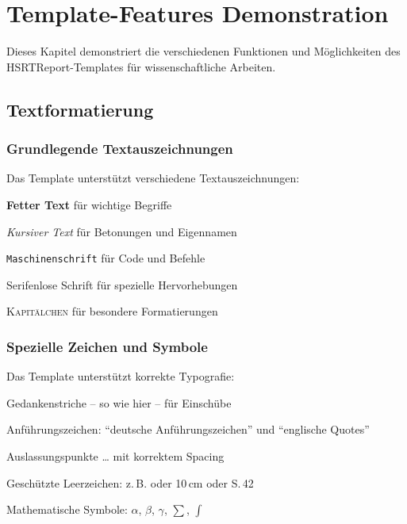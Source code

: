 
\chapter{Template-Features Demonstration}
\label{chap:template_demo}

Dieses Kapitel demonstriert die verschiedenen Funktionen und Möglichkeiten des HSRTReport-Templates für wissenschaftliche Arbeiten.

\section{Textformatierung}
\label{sec:textformatierung_demo}

\subsection*{Grundlegende Textauszeichnungen}
\label{subsec:textauszeichnungen}

Das Template unterstützt verschiedene Textauszeichnungen:
\begin{listenabsatz}
	\item \textbf{Fetter Text} für wichtige Begriffe
	\item \emph{Kursiver Text} für Betonungen und Eigennamen
	\item \texttt{Maschinenschrift} für Code und Befehle
	\item \textsf{Serifenlose Schrift} für spezielle Hervorhebungen
	\item \textsc{Kapitälchen} für besondere Formatierungen
\end{listenabsatz}

\subsection*{Spezielle Zeichen und Symbole}
\label{subsec:spezielle_zeichen}

Das Template unterstützt korrekte Typografie:
\begin{listenabsatz}
	\item Gedankenstriche -- so wie hier -- für Einschübe
	\item Anführungszeichen: "`deutsche Anführungszeichen"' und ``englische Quotes''
	\item Auslassungspunkte \ldots{} mit korrektem Spacing
	\item Geschützte Leerzeichen: z.\,B. oder 10\,cm oder S.\,42
	\item Mathematische Symbole: $\alpha$, $\beta$, $\gamma$, $\sum$, $\int$
\end{listenabsatz}

